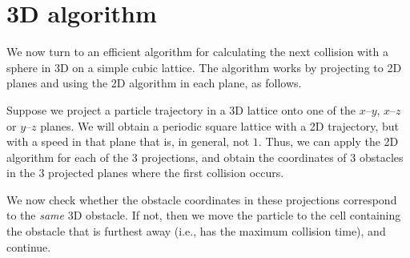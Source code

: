 \documentclass{iopart}
\begin{document}
%
%

\section{3D algorithm}

We now turn to an efficient algorithm for calculating the next collision with a sphere in 3D on a simple cubic lattice. The algorithm works by projecting to 2D planes and using the 2D algorithm in each plane, as follows.

Suppose we project a particle trajectory in a 3D lattice onto one of the $x$--$y$, $x$--$z$ or 
$y$--$z$ planes. We will obtain a periodic square lattice with a 2D trajectory, but with a speed in that plane that is, in general, not $1$. 
Thus, we can apply the 2D algorithm for each of the 3 projections, and obtain the coordinates of 3 obstacles in the 3 projected planes where the first collision occurs.  

We now check whether the obstacle coordinates in these projections correspond to the \emph{same} 3D obstacle. If not, then we move the particle to the cell containing the obstacle that is furthest away (i.e., has the maximum collision time), and continue.
\end{document}
